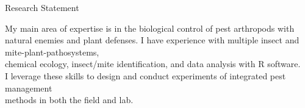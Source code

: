 \documentclass{resume} %
\begin{document}
\begin{rSection}{Research Statement}

My main area of expertise is in the biological control of pest arthropods with natural enemies and plant defenses. I have experience with multiple insect and mite-plant-pathosystems,\\ chemical ecology, insect/mite identification, and data analysis with R software.\\
I leverage these skills to design and conduct experiments of integrated pest management\\
methods in both the field and lab.

\end{rSection}
\end{document}
